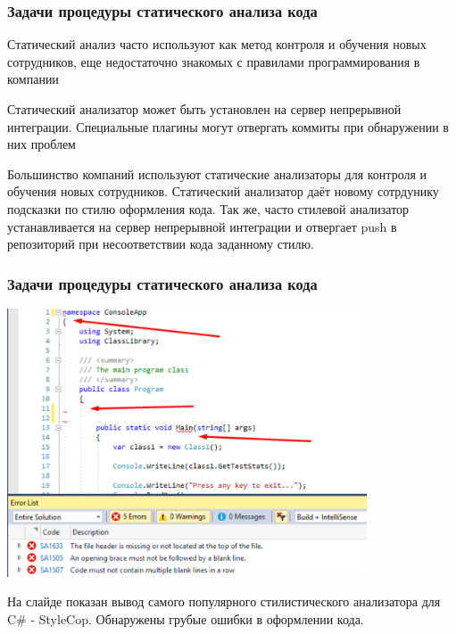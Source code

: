 \documentclass{../industrial-development}
\begin{document}
\begin{frame} \frametitle{Задачи процедуры статического анализа кода}
	\begin{block}{}
		Статический анализ часто используют как метод контроля и обучения новых сотрудников, еще недостаточно знакомых с правилами программирования в компании
	\end{block}
	\begin{block}{}
		Статический анализатор может быть установлен на сервер непрерывной интеграции. Специальные плагины могут отвергать коммиты при обнаружении в них проблем
	\end{block}
\end{frame}
\lecturenotes
Большинство компаний используют статические анализаторы для контроля и обучения новых сотрудников. Статический анализатор даёт новому сотрдунику подсказки по стилю оформления кода. Так же, часто стилевой анализатор устанавливается на сервер непрерывной интеграции и отвергает push в репозиторий при несоответствии кода заданному стилю.

\begin{frame} \frametitle{Задачи процедуры статического анализа кода}
	\centerline{\includegraphics[width=0.8\textwidth]{stylecop.pdf}}
\end{frame}
\lecturenotes
На слайде показан вывод самого популярного стилистического анализатора для C# - StyleCop. Обнаружены грубые ошибки в оформлении кода.
\end{document}
